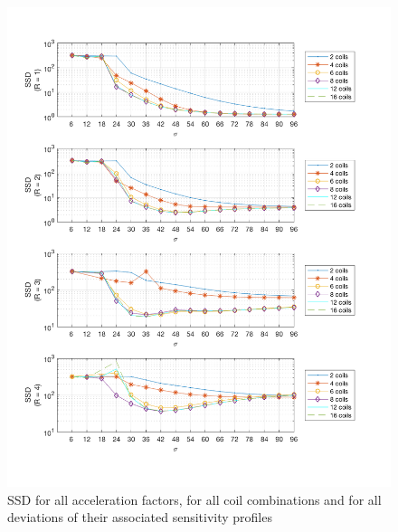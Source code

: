 \begin{figure}[H]
    \centering
    \includegraphics[width=1\textwidth,keepaspectratio]{2SSD}
    \caption{SSD for all acceleration factors, for all coil combinations and for all deviations of their associated sensitivity profiles}
    \label{fig:2SSD}
\end{figure}


